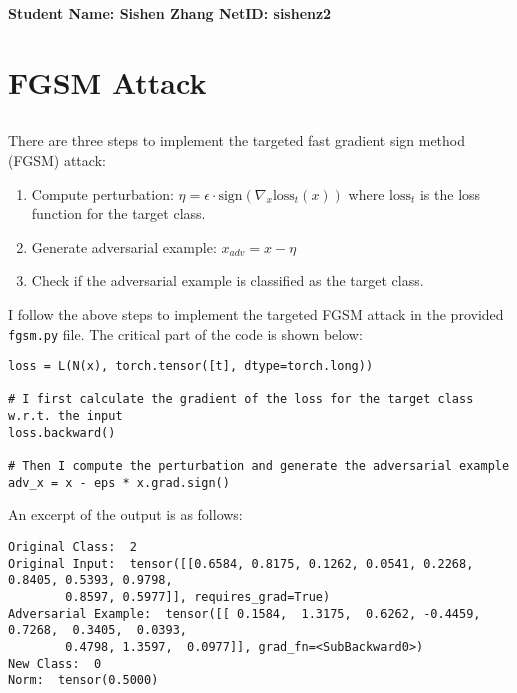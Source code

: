 \documentclass[10pt]{article}
\begin{document}
\vspace*{-0.2in}

\begin{center}
\bf Student Name: Sishen Zhang \hspace{3mm} NetID: sishenz2
\end{center}

\normalsize

\section{FGSM Attack}

\subsection{}

There are three steps to implement the targeted fast gradient sign method (FGSM) attack:
\begin{enumerate}
    \item Compute perturbation: $\eta = \epsilon \cdot \text{sign}(\nabla_x \text{loss}_t(x))$ where $\text{loss}_t$ is the loss function for the target class.
    \item Generate adversarial example: $x_{adv} = x - \eta$
    \item Check if the adversarial example is classified as the target class.
\end{enumerate}

I follow the above steps to implement the targeted FGSM attack in the provided \texttt{fgsm.py} file. The critical part of the code is shown below:

\begin{Verbatim}[frame=single]
loss = L(N(x), torch.tensor([t], dtype=torch.long))

# I first calculate the gradient of the loss for the target class w.r.t. the input 
loss.backward()

# Then I compute the perturbation and generate the adversarial example
adv_x = x - eps * x.grad.sign()
\end{Verbatim}

An excerpt of the output is as follows:

\begin{Verbatim}[frame=single]
Original Class:  2
Original Input:  tensor([[0.6584, 0.8175, 0.1262, 0.0541, 0.2268, 0.8405, 0.5393, 0.9798, 
        0.8597, 0.5977]], requires_grad=True)
Adversarial Example:  tensor([[ 0.1584,  1.3175,  0.6262, -0.4459,  0.7268,  0.3405,  0.0393,
        0.4798, 1.3597,  0.0977]], grad_fn=<SubBackward0>)
New Class:  0
Norm:  tensor(0.5000)
\end{Verbatim}
\end{document}
